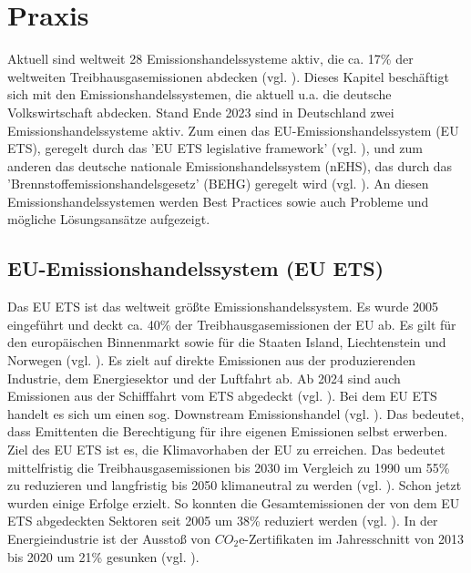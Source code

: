 \chapter{Praxis}

Aktuell sind weltweit 28 Emissionshandelssysteme aktiv, die ca. 17\% der weltweiten Treibhausgasemissionen abdecken (vgl. \cite[S. 7]{icap.2023}).
Dieses Kapitel beschäftigt sich mit den Emissionshandelssystemen, die aktuell u.a. die deutsche Volkswirtschaft abdecken.
Stand Ende 2023 sind in Deutschland zwei Emissionshandelssysteme aktiv.
Zum einen das EU-Emissionshandelssystem (EU ETS), geregelt durch das 'EU ETS legislative framework' (vgl. \cite{eu.2023}), und zum anderen das deutsche nationale Emissionshandelssystem (nEHS), das durch das 'Brennstoffemissionshandelsgesetz' (BEHG) geregelt wird (vgl. \cite{dehst.2023}).
An diesen Emissionshandelssystemen werden Best Practices sowie auch Probleme und mögliche Lösungsansätze aufgezeigt.

\section{EU-Emissionshandelssystem (EU ETS)}

Das EU ETS ist das weltweit größte Emissionshandelssystem. Es wurde 2005 eingeführt und deckt ca. 40\% der Treibhausgasemissionen der EU ab. Es gilt für den europäischen Binnenmarkt sowie für die Staaten Island, Liechtenstein und Norwegen (vgl. \cite[S. 186]{hubert.2020}).
Es zielt auf direkte Emissionen aus der produzierenden Industrie, dem Energiesektor und der Luftfahrt ab. Ab 2024 sind auch Emissionen aus der Schifffahrt vom ETS abgedeckt (vgl. \cite{eu.2023}).
Bei dem EU ETS handelt es sich um einen sog. Downstream Emissionshandel (vgl. \cite{dehst.2023}). 
Das bedeutet, dass Emittenten die Berechtigung für ihre eigenen Emissionen selbst erwerben. Ziel des EU ETS ist es, die Klimavorhaben der EU zu erreichen.
Das bedeutet mittelfristig die Treibhausgasemissionen bis 2030 im Vergleich zu 1990 um 55\% zu reduzieren und langfristig bis 2050 klimaneutral zu werden (vgl. \cite{eu.2023}). Schon jetzt wurden einige Erfolge erzielt. 
So konnten die Gesamtemissionen der von dem EU ETS abgedeckten Sektoren seit 2005 um 38\% reduziert werden (vgl. \cite{dehst3.2023}).
In der Energieindustrie ist der Ausstoß von $CO_2$e-Zertifikaten im Jahresschnitt von 2013 bis 2020 um 21\% gesunken (vgl. \cite{ub3.2023}).

